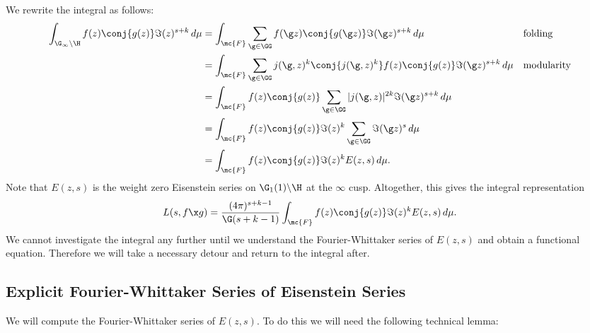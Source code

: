       We rewrite the integral as follows:
      \begin{align*}
        \int_{\G_{\infty}\backslash\H}f(z)\conj{g(z)}\Im(z)^{s+k}\,d\mu &= \int_{\mc{F}}\sum_{\g \in \GG}f(\g z)\conj{g(\g z)}\Im(\g z)^{s+k}\,d\mu && \text{folding} \\
        &= \int_{\mc{F}}\sum_{\g \in \GG}j(\g,z)^{k}\conj{j(\g,z)^{k}}f(z)\conj{g(z)}\Im(\g z)^{s+k}\,d\mu && \text{modularity} \\
        &= \int_{\mc{F}}f(z)\conj{g(z)}\sum_{\g \in \GG}|j(\g,z)|^{2k}\Im(\g z)^{s+k}\,d\mu \\
        &= \int_{\mc{F}}f(z)\conj{g(z)}\Im(z)^{k}\sum_{\g \in \GG}\Im(\g z)^{s}\,d\mu \\
        &= \int_{\mc{F}}f(z)\conj{g(z)}\Im(z)^{k}E(z,s)\,d\mu.
      \end{align*}
      Note that $E(z,s)$ is the weight zero Eisenstein series on $\G_{1}(1)\backslash\H$ at the $\infty$ cusp. Altogether, this gives the integral representation
      \begin{equation}\label{equ:Rankin-Selberg_integral-reresentation}
        L(s,f \x g) =  \frac{(4\pi)^{s+k-1}}{\G(s+k-1)}\int_{\mc{F}}f(z)\conj{g(z)}\Im(z)^{k}E(z,s)\,d\mu.
      \end{equation}
      We cannot investigate the integral any further until we understand the Fourier-Whittaker series of $E(z,s)$ and obtain a functional equation. Therefore we will take a necessary detour and return to the integral after.
    \subsection*{Explicit Fourier-Whittaker Series of Eisenstein Series}
      We will compute the Fourier-Whittaker series of $E(z,s)$. To do this we will need the following technical lemma:

